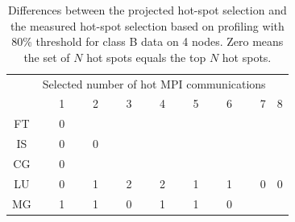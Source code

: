 \begin{table}
\caption{
Differences between the projected hot-spot selection and
the measured hot-spot selection based on profiling with 80\% threshold for class B data on 4 nodes. Zero means
the set of $N$ hot spots equals the top $N$ hot spots.
}%
\begin{center}
\begin{tabular}{c|r|r|r|r|r|r|r|r}
\hline
&\multicolumn{7}{c}{Selected number of hot MPI communications}\\
        & 1 & 2 & 3 & 4 & 5 & 6 & 7 & 8 \\
\hline
FT      & 0 &   &   &   &   &   &   &   \\  %
IS      & 0 & 0 &   &   &   &   &   &   \\  %
CG      & 0 &   &   &   &   &   &   &   \\  %
LU      & 0 & 1 & 2 & 2 & 1 & 1 & 0 & 0 \\  %
MG      & 1 & 1 & 0 & 1 & 1 & 0 &   &   \\  %
\hline
\hline
\end{tabular}
\end{center}
\label{tab:npb:hot}
\end{table}



